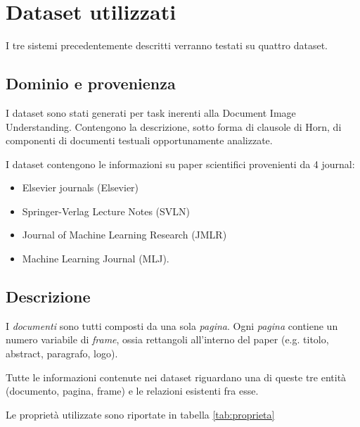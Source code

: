 \section{Dataset utilizzati}

I tre sistemi precedentemente descritti verranno testati su quattro dataset.

\subsection{Dominio e provenienza}
I dataset sono stati generati per task inerenti alla Document Image Understanding.
Contengono la descrizione, sotto forma di clausole di Horn, di componenti di documenti testuali opportunamente analizzate.

I dataset contengono le informazioni su paper scientifici provenienti da 4 journal:
\begin{itemize}
\item Elsevier journals (Elsevier)
\item Springer-Verlag Lecture Notes (SVLN)
\item Journal of Machine Learning Research (JMLR)
\item Machine Learning Journal (MLJ).
\end{itemize}

\subsection{Descrizione}
I \emph{documenti} sono tutti composti da una sola \emph{pagina}. Ogni \emph{pagina} contiene un numero variabile di \emph{frame}, ossia rettangoli all'interno del paper (e.g. titolo, abstract, paragrafo, logo).

Tutte le informazioni contenute nei dataset riguardano una di queste tre entità (documento, pagina, frame) e le relazioni esistenti fra esse.

Le proprietà utilizzate sono riportate in tabella \ref{tab:proprieta}

